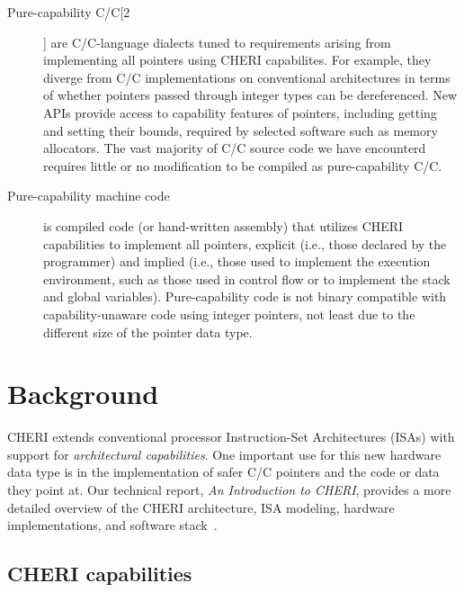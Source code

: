 \documentclass[12pt,twoside,openright,usletter]{article}
\newcommand*{\cpp}[1][]{C\textsmaller[2]{\nolinebreak[4]\hspace{-.05em}\raisebox{.45ex}{\textbf{++}}}}
\begin{document}
\begin{description}
\item[Pure-capability C/\cpp{}] are C/\cpp{}-language dialects tuned to
  requirements arising from implementing all pointers using CHERI capabilites.
  For example, they diverge from C/\cpp{} implementations on conventional
  architectures in terms of whether pointers passed through integer types can
  be dereferenced.
  New APIs provide access to capability features of pointers, including
  getting and setting their bounds, required by selected software such as
  memory allocators.
  The vast majority of C/\cpp{} source code we have encounterd requires little
  or no modification to be compiled as pure-capability C/\cpp{}.

\item[Pure-capability machine code] is compiled code (or hand-written
  assembly) that utilizes CHERI capabilities
  to implement all pointers, explicit (i.e., those declared by the programmer)
  and implied (i.e., those used to implement the execution
  environment, such as those used in control flow or to implement the stack
  and global variables).
  Pure-capability code is not binary compatible with capability-unaware code
  using integer pointers, not least due to the different size of the
  pointer data type.
\end{description}

\section{Background}

CHERI extends conventional processor Instruction-Set Architectures (ISAs) with
support for \textit{architectural capabilities}.
One important use for this new hardware data type is in the implementation
of safer C/\cpp{} pointers and the code or data they point at.
Our technical report, \textit{An Introduction to CHERI}, provides a more
detailed
overview of the CHERI architecture, ISA modeling, hardware implementations,
and software stack~\cite{UCAM-CL-TR-941}.

\subsection{CHERI capabilities}
\label{sec:cheri-capabilities}
\end{document}
